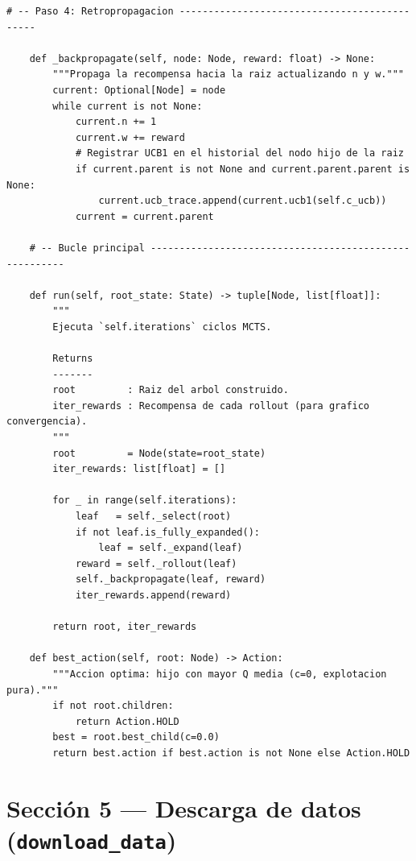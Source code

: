 \documentclass[12pt, a4paper]{article}
\begin{document}
\begin{lstlisting}[caption={Paso 4 y bucle principal del MCTS}]
    # -- Paso 4: Retropropagacion ---------------------------------------------

    def _backpropagate(self, node: Node, reward: float) -> None:
        """Propaga la recompensa hacia la raiz actualizando n y w."""
        current: Optional[Node] = node
        while current is not None:
            current.n += 1
            current.w += reward
            # Registrar UCB1 en el historial del nodo hijo de la raiz
            if current.parent is not None and current.parent.parent is None:
                current.ucb_trace.append(current.ucb1(self.c_ucb))
            current = current.parent

    # -- Bucle principal -------------------------------------------------------

    def run(self, root_state: State) -> tuple[Node, list[float]]:
        """
        Ejecuta `self.iterations` ciclos MCTS.

        Returns
        -------
        root         : Raiz del arbol construido.
        iter_rewards : Recompensa de cada rollout (para grafico convergencia).
        """
        root         = Node(state=root_state)
        iter_rewards: list[float] = []

        for _ in range(self.iterations):
            leaf   = self._select(root)
            if not leaf.is_fully_expanded():
                leaf = self._expand(leaf)
            reward = self._rollout(leaf)
            self._backpropagate(leaf, reward)
            iter_rewards.append(reward)

        return root, iter_rewards

    def best_action(self, root: Node) -> Action:
        """Accion optima: hijo con mayor Q media (c=0, explotacion pura)."""
        if not root.children:
            return Action.HOLD
        best = root.best_child(c=0.0)
        return best.action if best.action is not None else Action.HOLD
\end{lstlisting}

\section{Sección 5 --- Descarga de datos (\texttt{download\_data})}
\end{document}
